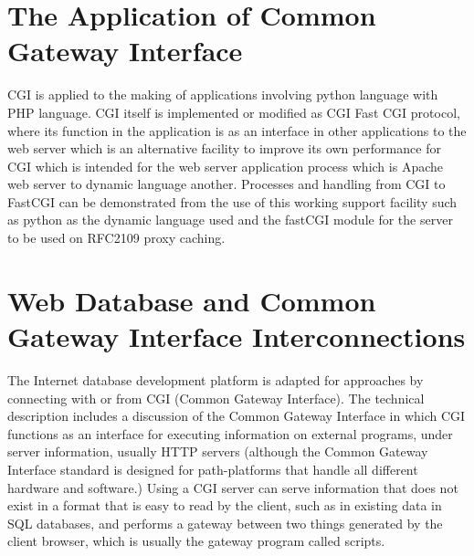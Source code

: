 \section{The Application of Common Gateway Interface }
CGI is applied to the making of applications involving python language with PHP language. CGI itself is implemented or modified as CGI Fast CGI protocol, where its function in the application is as an interface in other applications to the web server which is an alternative facility to improve its own performance for CGI which is intended for the web server application process which is Apache web server to dynamic language another. Processes and handling from CGI to FastCGI can be demonstrated from the use of this working support facility such as python as the dynamic language used and the fastCGI module for the server to be used on RFC2109 proxy caching.


\section{ Web Database and Common Gateway Interface Interconnections }
The Internet database development platform is adapted for approaches by connecting with or from CGI (Common Gateway Interface). The technical description includes a discussion of the Common Gateway Interface in which CGI functions as an interface for executing information on external programs, under server information, usually HTTP servers (although the Common Gateway Interface standard is designed for path-platforms that handle all different hardware and software.) Using a CGI server can serve information that does not exist in a format that is easy to read by the client, such as in existing data in SQL databases, and performs a gateway between two things generated by the client browser, which is usually the gateway program called scripts.